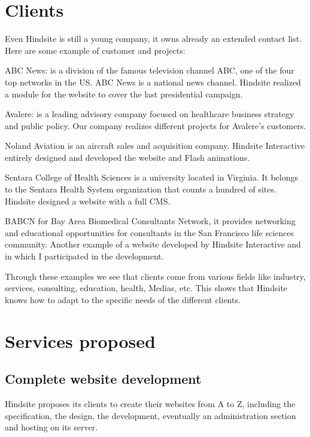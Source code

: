 \section{Clients}

Even Hindsite is still a young company, it owns already an extended contact
list. Here are some example of customer and projects:

ABC News: is a division of the famous television channel ABC, one of the
four top networks in the US. ABC News is a national news channel. Hindsite
realized a module for the website to cover the last presidential campaign.

Avalere: is a leading advisory company focused on healthcare business
strategy and public policy. Our company realizes different projects for
Avalere’s customers.

Noland Aviation is an aircraft sales and acquisition company. Hindsite
Interactive entirely designed and developed the website and Flash animations.

Sentara College of Health Sciences is a university located in Virginia. It
belongs to the Sentara Health System organization that counts a hundred of
sites. Hindsite designed a website with a full CMS.


BABCN for Bay Area Biomedical Consultants Network, it provides
networking and educational opportunities for consultants in the San Francisco
life sciences community. Another example of a website developed by Hindsite
Interactive and in which I participated in the development.

Through these examples we see that clients come from various fields like
industry, services, consulting, education, health, Medias, etc.
This shows that Hindsite knows how to adapt to the specific needs of the
different clients.

\section{Services proposed}

\subsection{Complete website development}

Hindsite proposes its clients to create their websites from A to Z, including the
specification, the design, the development, eventually an administration
section and hosting on its server.

